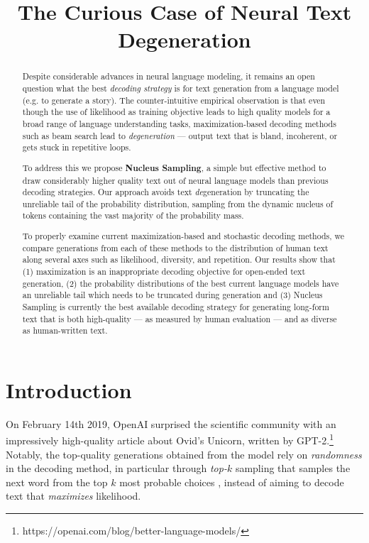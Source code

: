 \title{The Curious Case of Neural Text Degeneration}

\begin{abstract}
Despite considerable advances in neural language modeling, it remains an open question what the best \emph{decoding strategy} is for text generation from a language model (e.g. to generate a story). The counter-intuitive empirical observation is that even though the use of likelihood as training objective leads to high quality models for a broad range of language understanding tasks, maximization-based decoding methods such as beam search lead to \emph{degeneration} --- output text that is bland, incoherent, or gets stuck in repetitive loops. 

To address this we propose \textbf{Nucleus Sampling}, a simple but effective method to draw considerably higher quality text out of neural language models than previous decoding strategies. Our approach avoids text \emph{de}generation by truncating the unreliable tail of the probability distribution, sampling from the dynamic nucleus of tokens containing the vast majority of the probability mass.

To properly examine current maximization-based and stochastic decoding methods, we compare generations from each of these methods to the distribution of human text along several axes such as likelihood, diversity, and repetition. Our results show that (1) maximization is an inappropriate decoding objective for open-ended text generation, (2) the probability distributions of the best current language models have an unreliable tail which needs to be truncated during generation and (3) Nucleus Sampling is currently the best available decoding strategy for generating long-form text that is both high-quality --- as measured by human evaluation --- and as diverse as human-written text.
\end{abstract}

\section{Introduction}
\label{sec:intro}


On February 14th 2019, OpenAI surprised the scientific community with an impressively high-quality article about Ovid's Unicorn, written by GPT-2.\footnote{https://openai.com/blog/better-language-models/} 
Notably, the top-quality generations obtained from the model rely on \emph{randomness} 
in the decoding method, in particular through \emph{top-$k$} sampling that samples the next word from the top $k$ most probable choices \citep{fan2018hierarchical, holtzman2018l2w, radford2019BetterLMs}, instead of aiming to decode text that \emph{maximizes} likelihood.

